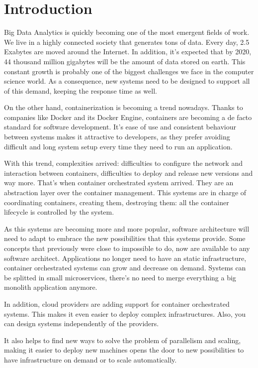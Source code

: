 
\chapter{Introduction} %

\label{Chapter1} %



Big Data Analytics is quickly becoming one of the most emergent fields of work. We live in a highly connected society that generates tons of data. Every day, 2.5 Exabytes are moved around the Internet. In addition, it’s expected that by 2020, 44 thousand million gigabytes will be the amount of data stored on earth. This constant growth is probably one of the biggest challenges we face in the computer science world. As a consequence, new systems need to be designed to support all of this demand, keeping the response time as well. 
 
On the other hand, containerization is becoming a trend nowadays. Thanks to companies like Docker and its Docker Engine, containers are becoming a de facto standard for software development. It’s ease of use and consistent behaviour between systems makes it attractive to developers, as they prefer avoiding difficult and long system setup every time they need to run an application.
 
With this trend, complexities arrived: difficulties to configure the network and interaction between containers, difficulties to deploy and release new versions and way more. That’s when container orchestrated system arrived. They are an abstraction layer over the container management. This systems are in charge of coordinating containers, creating them, destroying them: all the container lifecycle is controlled by the system.
 
As this systems are becoming more and more popular, software architecture will need to adapt to embrace the new possibilities that this systems provide. Some concepts that previously were close to impossible to do, now are available to any software architect. Applications no longer need to have an static infrastructure, container orchestrated systems can grow and decrease on demand. Systems can be splitted in small microservices, there’s no need to merge everything a big monolith application anymore.
 
In addition, cloud providers are adding support for container orchestrated systems. This makes it even easier to deploy complex infrastructures. Also, you can design systems independently of the providers. 
 
It also helps to find new ways to solve the problem of parallelism and scaling, making it easier to deploy new machines opens the door to new possibilities to have infrastructure on demand or to scale automatically.
 
